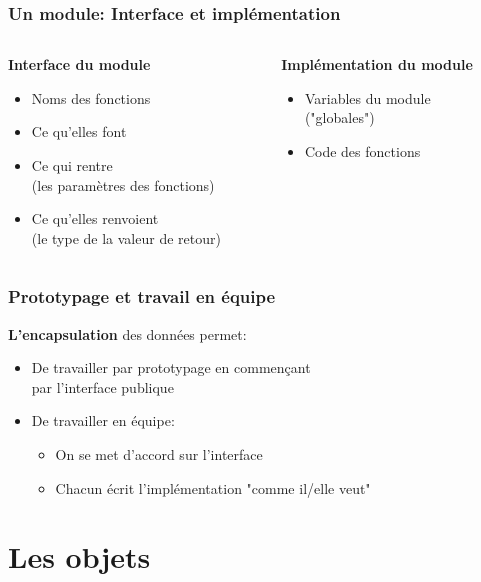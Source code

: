 \documentclass{beamer}
\begin{document}
\begin{frame}
\frametitle {Un module: Interface et implémentation}

\begin{columns}[t]

\begin{column}{6cm}
\textbf{Interface du module}
\begin{itemize}
  \item{Noms des fonctions}
  \item{Ce qu'elles font}
  \item{Ce qui rentre \\ (les paramètres des fonctions)}
  \item{Ce qu'elles renvoient \\ (le type de la valeur de retour)}
\end{itemize}
\end{column}

\begin{column}{6cm}
\textbf{Implémentation du module}
\begin{itemize}
  \item{Variables du module \\ ("globales")}
  \item{Code des fonctions}
\end{itemize}
\end{column}

\end{columns}

\end{frame}
  
\begin{frame}
\frametitle {Prototypage et travail en équipe}
\textbf{L'encapsulation} des données permet:
\begin{itemize}
  \item De travailler \alert{par prototypage} en commençant \\ par l'interface publique
  \item De travailler en équipe:
  \begin{itemize}
    \item On se met d'accord \alert{sur l'interface}
    \item Chacun écrit l'implémentation \alert{"comme il/elle veut"}
  \end{itemize}
\end{itemize}
\end{frame}

\section{Les objets}
\end{document}
